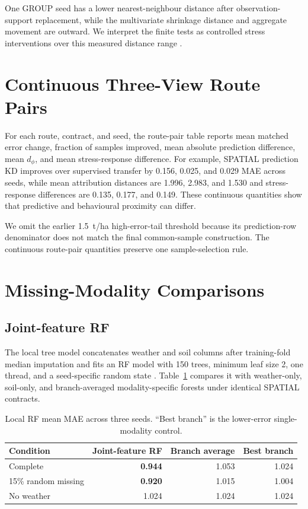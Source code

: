 \documentclass[runningheads]{venue/lncs/llncs}
\begin{document}
One GROUP seed has a lower nearest-neighbour distance after observation-support replacement, while the multivariate shrinkage distance and aggregate movement are outward. We interpret the finite tests as controlled stress interventions over this measured distance range \cite{Covert2021Removing,Hase2021OODExplainability}.

\section{Continuous Three-View Route Pairs}

For each route, contract, and seed, the route-pair table reports mean matched error change, fraction of samples improved, mean absolute prediction difference, mean $d_{\phi}$, and mean stress-response difference. For example, SPATIAL prediction KD improves over supervised transfer by 0.156, 0.025, and 0.029 MAE across seeds, while mean attribution distances are 1.996, 2.983, and 1.530 and stress-response differences are 0.135, 0.177, and 0.149. These continuous quantities show that predictive and behavioural proximity can differ.

We omit the earlier 1.5~t/ha high-error-tail threshold because its prediction-row denominator does not match the final common-sample construction. The continuous route-pair quantities preserve one sample-selection rule.

\section{Missing-Modality Comparisons}\label{sec:missing}

\subsection{Joint-feature RF}

The local tree model concatenates weather and soil columns after training-fold median imputation and fits an RF model with 150 trees, minimum leaf size 2, one thread, and a seed-specific random state \cite{Breiman2001RandomForests}. Table~\ref{tab:rf} compares it with weather-only, soil-only, and branch-averaged modality-specific forests under identical SPATIAL contracts.

\begin{table}[h]
\centering
\caption{Local RF mean MAE across three seeds. ``Best branch'' is the lower-error single-modality control.}
\label{tab:rf}
\small
\begin{tabular}{lrrr}
\toprule
Condition & Joint-feature RF & Branch average & Best branch\\
\midrule
Complete & \textbf{0.944} & 1.053 & 1.024\\
15\% random missing & \textbf{0.920} & 1.015 & 1.004\\
No weather & 1.024 & 1.024 & 1.024\\
\bottomrule
\end{tabular}
\end{table}
\end{document}
